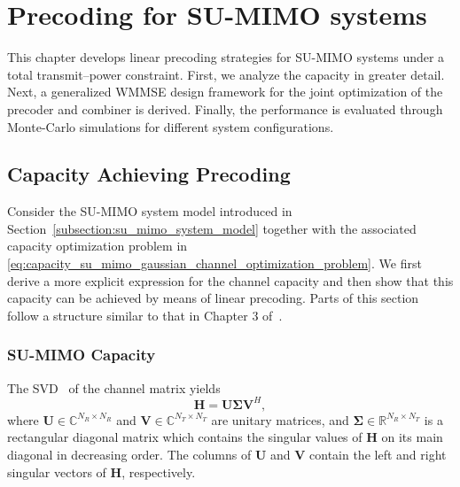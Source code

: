 \chapter{Precoding for SU-MIMO systems}
\label{chapter:su_mimo_precoding}

This chapter develops linear precoding strategies for \ac{SU}-\ac{MIMO} systems under a total transmit--power constraint.
First, we analyze the capacity in greater detail. Next, a generalized \acs{WMMSE} design framework for the joint optimization of the precoder and combiner is derived.
Finally, the performance is evaluated through Monte-Carlo simulations for different system configurations.

\section{Capacity Achieving Precoding}
\label{section:capacity_achieving_precoding}

Consider the \ac{SU}-\ac{MIMO} system model introduced in Section~\ref{subsection:su_mimo_system_model} together with the associated capacity optimization problem in \eqref{eq:capacity_su_mimo_gaussian_channel_optimization_problem}.
We first derive a more explicit expression for the channel capacity and then show that this capacity can be achieved by means of linear precoding.
Parts of this section follow a structure similar to that in Chapter 3 of~\cite{cornelis_2025}.

\subsection{SU-MIMO Capacity}
\label{subsection:su_mimo_capacity}

The \ac{SVD}~\cite{svd_lecture_notes} of the channel matrix yields
\begin{equation}
\label{eq:svd_channel_matrix}
    \mathbf{H} = \mathbf{U} \boldsymbol{\Sigma} \mathbf{V}^H,
\end{equation}
where $\mathbf{U} \in \mathbb{C}^{N_R \times N_R}$ and $\mathbf{V} \in \mathbb{C}^{N_T \times N_T}$ are unitary matrices, and $\mathbf{\Sigma} \in \mathbb{R}^{N_R \times N_T}$ is a rectangular diagonal matrix which contains the singular values of $\mathbf{H}$ on its main diagonal in decreasing order.
The columns of $\mathbf{U}$ and $\mathbf{V}$ contain the left and right singular vectors of $\mathbf{H}$, respectively.

